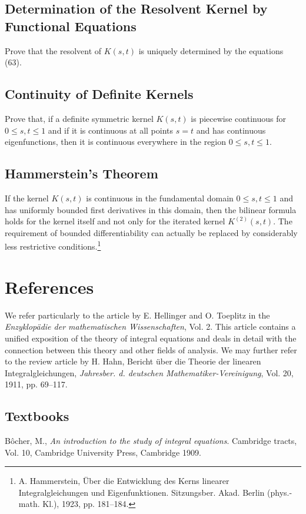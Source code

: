 \subsection{Determination of the Resolvent Kernel by Functional Equations}
Prove that the resolvent of $K(s,t)$ is uniquely determined by the equations (63).

\subsection{Continuity of Definite Kernels}
Prove that, if a definite symmetric kernel $K(s,t)$ is piecewise continuous for $0\le s,t\le1$ and if it is continuous at all points $s=t$ and has continuous eigenfunctions, then it is continuous everywhere in the region $0\le s,t\le1$.

\subsection{Hammerstein's Theorem}
If the kernel $K(s,t)$ is continuous in the fundamental domain $0\le s,t\le1$ and has uniformly bounded first derivatives in this domain, then the bilinear formula holds for the kernel itself and not only for the iterated kernel $K^{(2)}(s,t)$. The requirement of bounded differentiability can actually be replaced by considerably less restrictive conditions.\footnote{A. Hammerstein, \"Uber die Entwicklung des Kerns linearer Integralgleichungen und Eigenfunktionen. Sitzungsber. Akad. Berlin (phys.-math. Kl.), 1923, pp. 181--184.}

\section*{References}
We refer particularly to the article by E. Hellinger and O. Toeplitz in the \emph{Enzyklop\"adie der mathematischen Wissenschaften}, Vol. 2. This article contains a unified exposition of the theory of integral equations and deals in detail with the connection between this theory and other fields of analysis. We may further refer to the review article by H. Hahn, Bericht \"uber die Theorie der linearen Integralgleichungen, \emph{Jahresber. d. deutschen Mathematiker-Vereinigung}, Vol. 20, 1911, pp. 69--117.

\subsection*{Textbooks}
B\^ocher, M., \emph{An introduction to the study of integral equations}. Cambridge tracts, Vol. 10, Cambridge University Press, Cambridge 1909.

